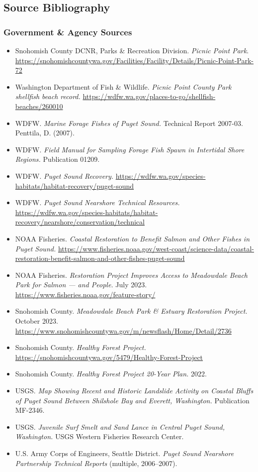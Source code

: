 \documentclass[11pt,letterpaper]{article}
\begin{document}
\subsection{Source Bibliography}

\subsubsection{Government \& Agency Sources}

\begin{itemize}
  \item Snohomish County DCNR, Parks \& Recreation Division. \textit{Picnic Point Park}. \url{https://snohomishcountywa.gov/Facilities/Facility/Details/Picnic-Point-Park-72}
  \item Washington Department of Fish \& Wildlife. \textit{Picnic Point County Park shellfish beach record.} \url{https://wdfw.wa.gov/places-to-go/shellfish-beaches/260010}
  \item WDFW. \textit{Marine Forage Fishes of Puget Sound.} Technical Report 2007-03. Penttila, D. (2007).
  \item WDFW. \textit{Field Manual for Sampling Forage Fish Spawn in Intertidal Shore Regions.} Publication 01209.
  \item WDFW. \textit{Puget Sound Recovery.} \url{https://wdfw.wa.gov/species-habitats/habitat-recovery/puget-sound}
  \item WDFW. \textit{Puget Sound Nearshore Technical Resources.} \url{https://wdfw.wa.gov/species-habitats/habitat-recovery/nearshore/conservation/technical}
  \item NOAA Fisheries. \textit{Coastal Restoration to Benefit Salmon and Other Fishes in Puget Sound.} \url{https://www.fisheries.noaa.gov/west-coast/science-data/coastal-restoration-benefit-salmon-and-other-fishes-puget-sound}
  \item NOAA Fisheries. \textit{Restoration Project Improves Access to Meadowdale Beach Park for Salmon --- and People.} July 2023. \url{https://www.fisheries.noaa.gov/feature-story/}
  \item Snohomish County. \textit{Meadowdale Beach Park \& Estuary Restoration Project.} October 2023. \url{https://www.snohomishcountywa.gov/m/newsflash/Home/Detail/2736}
  \item Snohomish County. \textit{Healthy Forest Project.} \url{https://snohomishcountywa.gov/5479/Healthy-Forest-Project}
  \item Snohomish County. \textit{Healthy Forest Project 20-Year Plan.} 2022.
  \item USGS. \textit{Map Showing Recent and Historic Landslide Activity on Coastal Bluffs of Puget Sound Between Shilshole Bay and Everett, Washington.} Publication MF-2346.
  \item USGS. \textit{Juvenile Surf Smelt and Sand Lance in Central Puget Sound, Washington.} USGS Western Fisheries Research Center.
  \item U.S. Army Corps of Engineers, Seattle District. \textit{Puget Sound Nearshore Partnership Technical Reports} (multiple, 2006--2007).
\end{itemize}
\end{document}
